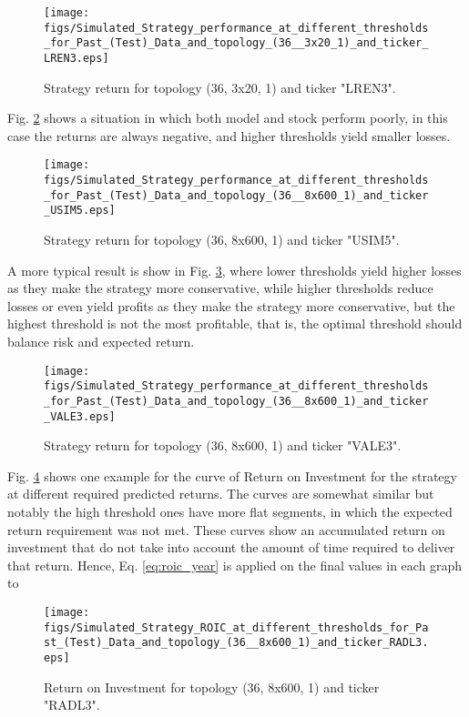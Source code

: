 \documentclass[conference]{IEEEtran}
\begin{document}
\begin{figure}[htbp]
	\centerline{\texttt{[image: figs/Simulated\_Strategy\_performance\_at\_different\_thresholds\_for\_Past\_(Test)\_Data\_and\_topology\_(36\_\_3x20\_1)\_and\_ticker\_LREN3.eps]}}
	\caption{Strategy return for topology (36, 3x20, 1) and ticker "LREN3".}
	\label{fig:strategy_good}
\end{figure}

Fig. \ref{fig:strategy_bad} shows a situation in which both model and stock perform poorly, in this case the returns are always negative, and higher thresholds yield smaller losses.

\begin{figure}[htbp]
	\centerline{\texttt{[image: figs/Simulated\_Strategy\_performance\_at\_different\_thresholds\_for\_Past\_(Test)\_Data\_and\_topology\_(36\_\_8x600\_1)\_and\_ticker\_USIM5.eps]}}
	\caption{Strategy return for topology (36, 8x600, 1) and ticker "USIM5".}
	\label{fig:strategy_bad}
\end{figure}

A more typical result is show in Fig. \ref{fig:strategy_okay}, where lower thresholds yield higher losses as they make the strategy more conservative, while higher thresholds reduce losses or even yield profits as they make the strategy more conservative, but the highest threshold is not the most profitable, that is, the optimal threshold should balance risk and expected return.

\begin{figure}[htbp]
	\centerline{\texttt{[image: figs/Simulated\_Strategy\_performance\_at\_different\_thresholds\_for\_Past\_(Test)\_Data\_and\_topology\_(36\_\_8x600\_1)\_and\_ticker\_VALE3.eps]}}
	\caption{Strategy return for topology (36, 8x600, 1) and ticker "VALE3".}
	\label{fig:strategy_okay}
\end{figure}

Fig. \ref{fig:roic_okay} shows one example for the curve of Return on Investment for the strategy at different required predicted returns. The curves are somewhat similar but notably the high threshold ones have more flat segments, in which the expected return requirement was not met. These curves show an accumulated return on investment that do not take into account the amount of time required to deliver that return. Hence, Eq. \ref{eq:roic_year} is applied on the final values in each graph to 

\begin{figure}[htbp]
	\centerline{\texttt{[image: figs/Simulated\_Strategy\_ROIC\_at\_different\_thresholds\_for\_Past\_(Test)\_Data\_and\_topology\_(36\_\_8x600\_1)\_and\_ticker\_RADL3.eps]}}
	\caption{Return on Investment for topology (36, 8x600, 1) and ticker "RADL3".}
	\label{fig:roic_okay}
\end{figure}
\end{document}
